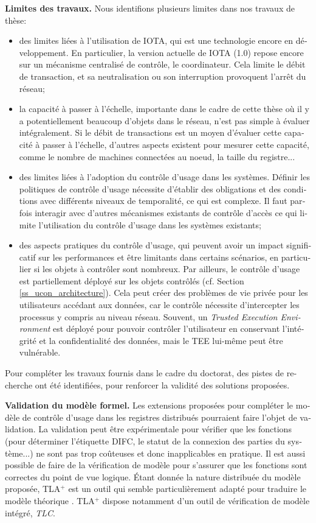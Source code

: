 \begin{otherlanguage}{french}
\textbf{Limites des travaux.}
Nous identifions plusieurs limites dans nos travaux de thèse:

\begin{itemize}
    \item des limites liées à l'utilisation de IOTA, qui est une technologie encore en développement. En particulier, la version actuelle de IOTA (1.0) repose encore sur un mécanisme centralisé de contrôle, le coordinateur. Cela limite le débit de transaction, et sa neutralisation ou son interruption provoquent l'arrêt du réseau; 
    \item la capacité à passer à l'échelle, importante dans le cadre de cette thèse où il y a potentiellement beaucoup d'objets dans le réseau, n'est pas simple à évaluer intégralement. Si le débit de transactions est un moyen d'évaluer cette capacité à passer à l'échelle, d'autres aspects existent pour mesurer cette capacité, comme le nombre de machines connectées au noeud, la taille du registre...
    \item des limites liées à l'adoption du contrôle d'usage dans les systèmes. Définir les politiques de contrôle d'usage nécessite d'établir des obligations et des conditions avec différents niveaux de temporalité, ce qui est complexe. Il faut parfois interagir avec d'autres mécanismes existants de contrôle d'accès ce qui limite l'utilisation du contrôle d'usage dans les systèmes existants;
    \item des aspects pratiques du contrôle d'usage, qui peuvent avoir un impact significatif sur les performances et être limitants dans certains scénarios, en particulier si les objets à contrôler sont nombreux. Par ailleurs, le contrôle d'usage est partiellement déployé sur les objets contrôlés (cf. Section \ref{ss_ucon_architecture}). Cela peut créer des problèmes de vie privée pour les utilisateurs accédant aux données, car le contrôle nécessite d'intercepter les processus y compris au niveau réseau. Souvent, un \emph{Trusted Execution Environment} est déployé pour pouvoir contrôler l'utilisateur en conservant l'intégrité et la confidentialité des données, mais le TEE lui-même peut être vulnérable.
\end{itemize}

Pour compléter les travaux fournis dans le cadre du doctorat, des pistes de recherche ont été identifiées, pour renforcer la validité des solutions proposées.

\textbf{Validation du modèle formel.} Les extensions proposées pour compléter le modèle de contrôle d'usage dans les registres distribués pourraient faire l'objet de validation. La validation peut être expérimentale pour vérifier que les fonctions (pour déterminer l'étiquette DIFC, le statut de la connexion des parties du système...) ne sont pas trop coûteuses et donc inapplicables en pratique. Il est aussi possible de faire de la vérification de modèle pour s'assurer que les fonctions sont correctes du point de vue logique. Étant donnée la nature distribuée du modèle proposée, TLA$^{+}$ \cite{Lamport1992} est un outil qui semble particulièrement adapté pour traduire le modèle théorique \cite{Lazouski2010}. TLA$^{+}$ dispose notamment d'un outil de vérification de modèle intégré, \emph{TLC}.


\end{otherlanguage}
